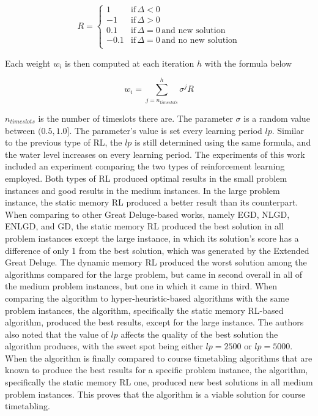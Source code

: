 \[
	R = 
	\begin{cases}
	1 & \text{if}\,\Delta < 0 \\
	-1 & \text{if}\,\Delta > 0 \\
	0.1 & \text{if}\,\Delta = 0\,\text{and new solution} \\
	-0.1 & \text{if}\,\Delta = 0\,\text{and no new solution} \\
	\end{cases}
\]

Each weight $w_{i}$ is then computed at each iteration $h$ with the formula below

\[
	w_{i} = \sum_{j = n_{timeslots}}^{h} \sigma^{j}R
\]

$n_{timeslots}$ is the number of timeslots there are. The parameter $\sigma$ is a random value between $(0.5, 1.0]$. The parameter's value is set every learning period $lp$. Similar to the previous type of RL, the $lp$ is still determined using the same formula, and the water level increases on every learning period. The experiments of this work included an experiment comparing the two types of reinforcement learning employed. Both types of RL produced optimal results in the small problem instances and good results in the medium instances. In the large problem instance, the static memory RL produced a better result than its counterpart. When comparing to other Great Deluge-based works, namely EGD, NLGD, ENLGD, and GD, the static memory RL produced the best solution in all problem instances except the large instance, in which its solution's score has a difference of only 1 from the best solution, which was generated by the Extended Great Deluge. The dynamic memory RL produced the worst solution among the algorithms compared for the large problem, but came in second overall in all of the medium problem instances, but one in which it came in third. When comparing the algorithm to hyper-heuristic-based algorithms with the same problem instances, the algorithm, specifically the static memory RL-based algorithm, produced the best results, except for the large instance. The authors also noted that the value of $lp$ affects the quality of the best solution the algorithm produces, with the sweet spot being either $lp = 2500$ or $lp = 5000$. When the algorithm is finally compared to course timetabling algorithms that are known to produce the best results for a specific problem instance, the algorithm, specifically the static memory RL one, produced new best solutions in all medium problem instances. This proves that the algorithm is a viable solution for course timetabling.

